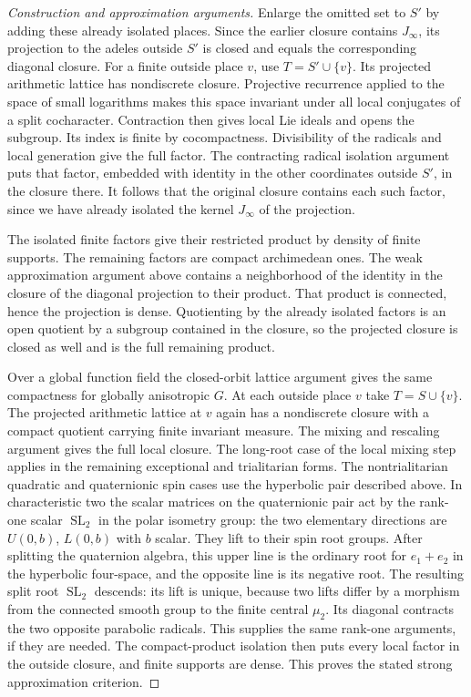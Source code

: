 \documentclass[11pt,a4paper,openany,oneside]{book}
\theoremstyle{resultstyle}
\theoremstyle{definition}
\numberwithin{equation}{chapter}
\begin{document}
\begin{proof}[Construction and approximation arguments]
Enlarge the omitted set to \(S'\) by adding these already
isolated places. Since the earlier closure contains
\(J_\infty\), its projection to the adeles outside \(S'\)
is closed and equals the corresponding diagonal closure.
For a finite outside place \(v\), use
\(T=S'\cup\{v\}\). Its projected arithmetic lattice has
nondiscrete closure. Projective recurrence applied to the
space of small logarithms makes this space invariant under
all local conjugates of a split cocharacter. Contraction
then gives local Lie ideals and opens the subgroup. Its index
is finite by cocompactness. Divisibility of the radicals and
local generation give the full factor. The contracting radical
isolation argument puts that factor, embedded with identity
in the other coordinates outside \(S'\), in the closure there.
It follows that the original closure contains each such
factor, since we have already isolated the kernel
\(J_\infty\) of the projection.

The isolated finite factors give their restricted product by
density of finite supports. The remaining factors are compact
archimedean ones. The weak approximation argument above
contains a neighborhood of the identity in the closure of
the diagonal projection to their product. That product is
connected, hence the projection is dense. Quotienting by
the already isolated factors is an open quotient by a
subgroup contained in the closure, so the projected closure
is closed as well and is the full remaining product.

Over a global function field the closed-orbit lattice
argument gives the same compactness for globally anisotropic
\(G\). At each outside place \(v\) take \(T=S\cup\{v\}\).
The projected arithmetic lattice at \(v\) again has a
nondiscrete closure with a compact quotient carrying finite
invariant measure. The mixing and rescaling argument
gives the full local closure. The long-root case of the
local mixing step applies in the remaining exceptional and
trialitarian forms. The nontrialitarian quadratic and
quaternionic spin cases use the hyperbolic pair described
above. In characteristic two the scalar matrices on
the quaternionic pair act by the rank-one scalar
\(\operatorname{SL}_2\) in the polar isometry group: the
two elementary directions are \(U(0,b)\), \(L(0,b)\) with
\(b\) scalar. They lift to their spin root groups. After splitting the quaternion algebra, this upper line
is the ordinary root for \(e_1+e_2\) in the hyperbolic
four-space, and the opposite line is its negative root.
The resulting split root \(\operatorname{SL}_2\) descends:
its lift is unique, because two lifts differ by a
morphism from the connected smooth group to the finite
central \(\mu_2\). Its diagonal contracts the two opposite
parabolic radicals. This supplies the same rank-one
arguments, if they are needed. The compact-product
isolation then puts every local factor in the outside
closure, and finite supports are dense. This proves the
stated strong approximation criterion.
\end{proof}
\end{document}
